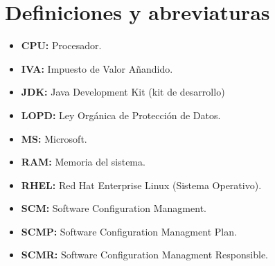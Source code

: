 \section{Definiciones y abreviaturas}
\begin{itemize}
	\item \textbf{CPU:} Procesador.
	\item \textbf{IVA:} Impuesto de Valor Añandido.
	\item \textbf{JDK:} Java Development Kit (kit de desarrollo)
	\item \textbf{LOPD:} Ley Orgánica de Protección de Datos.
	\item \textbf{MS:} Microsoft.
	\item \textbf{RAM:} Memoria del sistema.
	\item \textbf{RHEL:} Red Hat Enterprise Linux (Sistema Operativo).
	\item \textbf{SCM:} Software Configuration Managment.
	\item \textbf{SCMP:} Software Configuration Managment Plan.
	\item \textbf{SCMR:} Software Configuration Managment Responsible.
\end{itemize}
